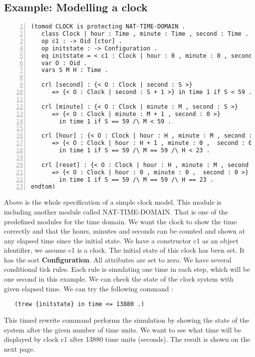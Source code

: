 \documentclass{report}
\begin{document}
\subsection{Example: Modelling a clock}
\begin{lstlisting}[numbers=left, frame=lines, xleftmargin=5.0ex]
(tomod CLOCK is protecting NAT-TIME-DOMAIN .
   class Clock | hour : Time , minute : Time , second : Time .
   op c1 : -> Oid [ctor] .
   op initstate : -> Configuration .
   eq initstate = < c1 : Clock | hour : 0 , minute : 0 , second : 0 > .
   var O : Oid . 
   vars S M H : Time .
	
   crl [second] : {< O : Clock | second : S >} 
      => {< O : Clock | second : S + 1 >} in time 1 if S < 59 .
			
   crl [minute] : {< O : Clock | minute : M , second : S >} 
      => {< O : Clock | minute : M + 1 , second : 0 >} 
        in time 1 if S == 59 /\ M < 59 .
				
   crl [hour] : {< O : Clock | hour : H , minute : M , second : S >} 
      => {< O : Clock | hour : H + 1 , minute : 0 ,  second : 0 >} 
        in time 1 if S == 59 /\ M == 59 /\ H < 23 .
				
   crl [reset] : {< O : Clock | hour : H , minute : M , second : S >} 
      => {< O : Clock | hour : 0 , minute : 0 ,  second : 0 >} 
        in time 1 if S == 59 /\ M == 59 /\ H == 23 .
endtom)

\end{lstlisting}
\vspace{0.5cm}
Above is the whole specification of a simple clock model. This module is including another module called NAT-TIME-DOMAIN. That is one of the predefined modules for the time domain.
We want the clock to show the time correctly and that the hours, minutes and seconds can be counted and shown at any elapsed time since the initial state. We have a constructor c1 as an object identifier, we assume c1 is a clock. The initial state of this clock has been set. It has the sort {\bf Configuration}. All attributes are set to zero. We have several conditional tick rules. Each rule is simulating one time in each step, which will be one second in this example. We can check the state of the clock system with given elapsed time. We can try the following command :
\begin{verbatim}
   (trew {initstate} in time <= 13880 .)
\end{verbatim}
This timed rewrite command performs the simulation by showing the state of the system after the given number of time units. We want to see what time will be displayed by clock c1 after 13880 time units (seconds). The result is shown on the next page.
\end{document}
